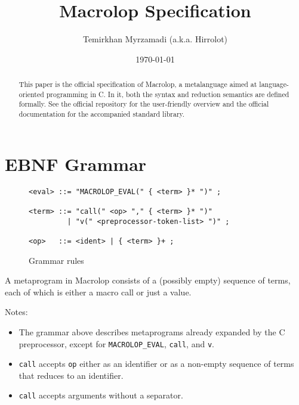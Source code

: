 \documentclass[12pt]{article}
\theoremstyle{break}
\begin{document}
\title{Macrolop Specification}
\date{\today}
\author{Temirkhan Myrzamadi (a.k.a. Hirrolot)}
\maketitle

\begin{abstract}
This paper is the official specification of Macrolop, a metalanguage aimed at language-oriented
programming in C. In it, both the syntax and reduction semantics are defined formally. See the
official repository \cite{Macrolop} for the user-friendly overview and the official documentation
\cite{MacrolopDocs} for the accompanied standard library.
\end{abstract}

\tableofcontents

\newpage

\section{EBNF Grammar}

\begin{figure}[H]
    \caption{Grammar rules}

\begin{verbatim}
<eval> ::= "MACROLOP_EVAL(" { <term> }* ")" ;

<term> ::= "call(" <op> "," { <term> }* ")"
         | "v(" <preprocessor-token-list> ")" ;

<op>   ::= <ident> | { <term> }+ ;
\end{verbatim}

\end{figure}

A metaprogram in Macrolop consists of a (possibly empty) sequence of terms, each of which
is either a macro call or just a value.

Notes:

\begin{itemize}
    \item The grammar above describes metaprograms already expanded by the C preprocessor,
    except for \texttt{MACROLOP\_EVAL}, \texttt{call}, and \texttt{v}.
    \item \texttt{call} accepts \texttt{op} either as an identifier or as a non-empty
    sequence of terms that reduces to an identifier.
    \item \texttt{call} accepts arguments without a separator.
\end{itemize}
\end{document}
